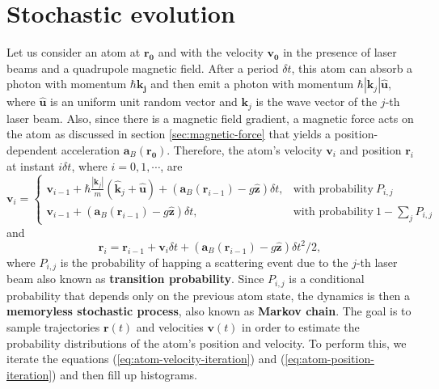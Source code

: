 %
\section{Stochastic evolution}
\label{sec:stochastic-evolution}
%

Let us consider an atom at $ \mathbf{r_0} $ and with the velocity $ \mathbf{v_0} $ in the presence of laser beams and a quadrupole magnetic field. After a period $ \delta t $, this atom can absorb a photon with momentum $ \hbar \mathbf{k_j} $ and then emit a photon with momentum $ \hbar |\mathbf{k}_j| \mathbf{\hat{u}} $, where $ \mathbf{\hat{u}} $ is an uniform unit random vector and $ \mathbf{k}_j $ is the wave vector of the $j$-th laser beam. Also, since there is a magnetic field gradient, a magnetic force acts on the atom as discussed in section \ref{sec:magnetic-force} that yields a position-dependent acceleration $ \mathbf{a}_{B}(\mathbf{r_0}) $. Therefore, the atom's velocity $ \mathbf{v}_i $ and position $ \mathbf{r}_i $ at instant $ i \delta t $, where $ i = 0, 1, \cdots $, are
\begin{equation}
    \mathbf{v}_{i} = \left\{ \begin{array}{lr}
        \mathbf{v}_{i - 1} + \hbar \frac{|\mathbf{k}_j|}{m}(\mathbf{\hat{k}}_j + \mathbf{\hat{u}}) + (\mathbf{a}_B(\mathbf{r}_{i - 1})- g \mathbf{\hat{z}}) \delta t, & \textrm{with probability}\ P_{i,j}
        \\
        \mathbf{v}_{i - 1} + (\mathbf{a}_B(\mathbf{r}_{i - 1})- g \mathbf{\hat{z}}) \delta t, & \textrm{with probability}\ 1 - \sum_{j} P_{i,j}
        \end{array} \right.
        \label{eq:atom-velocity-iteration}
\end{equation}
and
\begin{equation}
    \mathbf{r}_i = \mathbf{r}_{i - 1} + \mathbf{v}_{i}\delta t + (\mathbf{a}_B(\mathbf{r}_{i - 1}) - g \mathbf{\hat{z}}) \delta t^2 / 2,
    \label{eq:atom-position-iteration}
\end{equation}
where $ P_{i,j} $ is the probability of happing a scattering event due to the $ j $-th laser beam also known as \textbf{transition probability}. Since $ P_{i,j} $ is a conditional probability that depends only on the previous atom state, the dynamics is then a \textbf{memoryless stochastic process}, also known as \textbf{Markov chain}. The goal is to sample trajectories $ \mathbf{r}(t) $ and velocities $ \mathbf{v}(t) $ in order to estimate the probability distributions of the atom's position and velocity. To perform this, we iterate the equations (\ref{eq:atom-velocity-iteration}) and (\ref{eq:atom-position-iteration}) and then fill up histograms.


